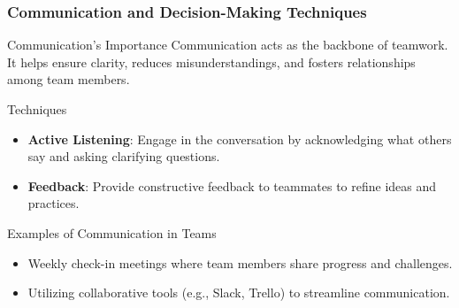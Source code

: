 \documentclass[aspectratio=169]{beamer}
\begin{document}
\begin{frame}[fragile]
    \frametitle{Communication and Decision-Making Techniques}
    \begin{block}{Communication's Importance}
        Communication acts as the backbone of teamwork. It helps ensure clarity, reduces misunderstandings, and fosters relationships among team members.
    \end{block}
    
    \begin{block}{Techniques}
        \begin{itemize}
            \item \textbf{Active Listening}: Engage in the conversation by acknowledging what others say and asking clarifying questions.
            \item \textbf{Feedback}: Provide constructive feedback to teammates to refine ideas and practices.
        \end{itemize}
    \end{block}
    
    \begin{exampleblock}{Examples of Communication in Teams}
        \begin{itemize}
            \item Weekly check-in meetings where team members share progress and challenges.
            \item Utilizing collaborative tools (e.g., Slack, Trello) to streamline communication.
        \end{itemize}
    \end{exampleblock}
\end{frame}
\end{document}
